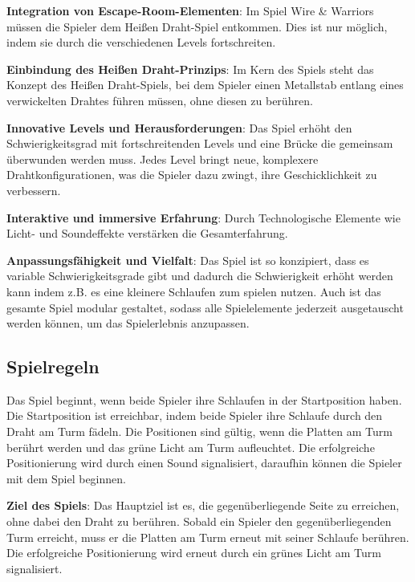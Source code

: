 \begin{compactitem}
 \item \textbf{Integration von Escape-Room-Elementen}: Im Spiel Wire \& Warriors müssen die Spieler dem Heißen Draht-Spiel entkommen. Dies ist nur möglich, indem sie durch die verschiedenen Levels fortschreiten. 
 \item \textbf{Einbindung des Heißen Draht-Prinzips}: Im Kern des Spiels steht das Konzept des Heißen Draht-Spiels, bei dem Spieler einen Metallstab entlang eines verwickelten Drahtes führen müssen, ohne diesen zu berühren.
 \item \textbf{Innovative Levels und Herausforderungen}: Das Spiel erhöht den Schwierigkeitsgrad mit fortschreitenden Levels und eine Brücke die gemeinsam überwunden werden muss. Jedes Level bringt neue, komplexere Drahtkonfigurationen, was die Spieler dazu zwingt, ihre Geschicklichkeit zu verbessern.
 \item \textbf{Interaktive und immersive Erfahrung}: Durch Technologische Elemente wie Licht- und Soundeffekte verstärken die Gesamterfahrung.
 \item \textbf{Anpassungsfähigkeit und Vielfalt}: Das Spiel ist so konzipiert, dass es variable Schwierigkeitsgrade gibt und dadurch die Schwierigkeit erhöht werden kann indem z.B. es eine kleinere Schlaufen zum spielen nutzen. Auch ist das gesamte Spiel modular gestaltet, sodass alle Spielelemente jederzeit ausgetauscht werden können, um das Spielerlebnis anzupassen.
\end{compactitem}

\subsection{Spielregeln}

Das Spiel beginnt, wenn beide Spieler ihre Schlaufen in der Startposition haben. Die Startposition ist erreichbar, indem beide Spieler ihre Schlaufe durch den Draht am Turm fädeln. Die Positionen sind gültig, wenn die Platten am Turm berührt werden und das grüne Licht am Turm aufleuchtet. Die erfolgreiche Positionierung wird durch einen Sound signalisiert, daraufhin können die Spieler mit dem Spiel beginnen.

\textbf{Ziel des Spiels}: Das Hauptziel ist es, die gegenüberliegende Seite zu erreichen, ohne dabei den Draht zu berühren. Sobald ein Spieler den gegenüberliegenden Turm erreicht, muss er die Platten am Turm erneut mit seiner Schlaufe berühren. Die erfolgreiche Positionierung wird erneut durch ein grünes Licht am Turm signalisiert.

